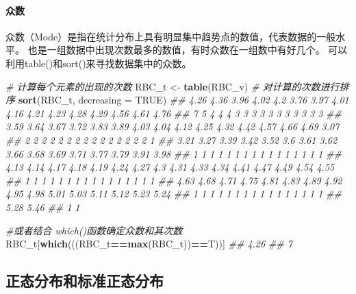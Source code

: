 \documentclass[
]{article}
\newenvironment{Shaded}{\begin{snugshade}}{\end{snugshade}}
\newcommand{\CommentTok}[1]{\textcolor[rgb]{0.56,0.35,0.01}{\textit{#1}}}
\newcommand{\DataTypeTok}[1]{\textcolor[rgb]{0.13,0.29,0.53}{#1}}
\newcommand{\KeywordTok}[1]{\textcolor[rgb]{0.13,0.29,0.53}{\textbf{#1}}}
\newcommand{\NormalTok}[1]{#1}
\newcommand{\OperatorTok}[1]{\textcolor[rgb]{0.81,0.36,0.00}{\textbf{#1}}}
\newcommand{\OtherTok}[1]{\textcolor[rgb]{0.56,0.35,0.01}{#1}}
\newcommand{\StringTok}[1]{\textcolor[rgb]{0.31,0.60,0.02}{#1}}
\begin{document}
\hypertarget{ux4f17ux6570}{%
\paragraph{众数}\label{ux4f17ux6570}}

众数（Mode）是指在统计分布上具有明显集中趋势点的数值，代表数据的一般水平。 也是一组数据中出现次数最多的数值，有时众数在一组数中有好几个。
可以利用table()和sort()来寻找数据集中的众数。

\begin{Shaded}
\begin{Highlighting}[]
\CommentTok{# 计算每个元素的出现的次数}
\NormalTok{RBC_t <-}\StringTok{ }\KeywordTok{table}\NormalTok{(RBC_v) }
 \CommentTok{# 对计算的次数进行排序}
\KeywordTok{sort}\NormalTok{(RBC_t, }\DataTypeTok{decreasing =} \OtherTok{TRUE}\NormalTok{) }
\CommentTok{##  4.26 4.36 3.96 4.02  4.2 3.76 3.97 4.01 4.16 4.21 4.23 4.28 4.29 4.56 4.61 4.76 }
\CommentTok{##     7    5    4    4    4    3    3    3    3    3    3    3    3    3    3    3 }
\CommentTok{##  3.59 3.64 3.67 3.72 3.83 3.89 4.03 4.04 4.12 4.25 4.32 4.42 4.57 4.66 4.69 3.07 }
\CommentTok{##     2    2    2    2    2    2    2    2    2    2    2    2    2    2    2    1 }
\CommentTok{##  3.21 3.27 3.39 3.42 3.52  3.6 3.61 3.62 3.66 3.68 3.69 3.71 3.77 3.79 3.91 3.98 }
\CommentTok{##     1    1    1    1    1    1    1    1    1    1    1    1    1    1    1    1 }
\CommentTok{##  4.13 4.14 4.17 4.18 4.19 4.24 4.27  4.3 4.31 4.33 4.34 4.41 4.47 4.49 4.54 4.55 }
\CommentTok{##     1    1    1    1    1    1    1    1    1    1    1    1    1    1    1    1 }
\CommentTok{##  4.63 4.68 4.71 4.75 4.81 4.83 4.89 4.92 4.95 4.98 5.01 5.03 5.11 5.12 5.23 5.24 }
\CommentTok{##     1    1    1    1    1    1    1    1    1    1    1    1    1    1    1    1 }
\CommentTok{##  5.28 5.46 }
\CommentTok{##     1    1 }

\CommentTok{#或者结合 which()函数确定众数和其次数}
\NormalTok{RBC_t[}\KeywordTok{which}\NormalTok{(((RBC_t}\OperatorTok{==}\KeywordTok{max}\NormalTok{(RBC_t))}\OperatorTok{==}\NormalTok{T))]}
\CommentTok{## 4.26 }
\CommentTok{##    7 }
\end{Highlighting}
\end{Shaded}

\hypertarget{ux6b63ux6001ux5206ux5e03ux548cux6807ux51c6ux6b63ux6001ux5206ux5e03}{%
\subsection{正态分布和标准正态分布}\label{ux6b63ux6001ux5206ux5e03ux548cux6807ux51c6ux6b63ux6001ux5206ux5e03}}
\end{document}
